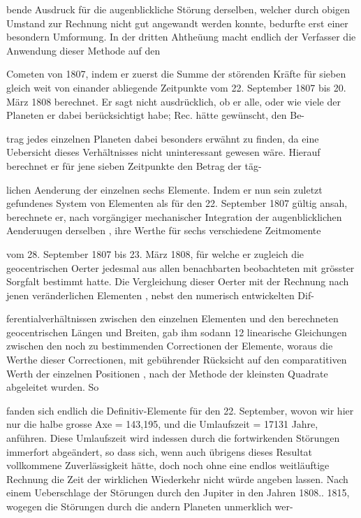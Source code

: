 \documentclass[10pt,a4paper]{article}
\begin{document}
bende Ausdruck für die augenblickliche Störung derselben, welcher durch obigen Umstand zur Rechnung nicht gut angewandt werden konnte, bedurfte erst einer besondern Umformung. In der dritten Ahtheüung macht endlich der Verfasser die Anwendung dieser Methode auf den

Cometen von 1807, indem er zuerst die Summe der störenden Kräfte für sieben gleich weit von einander abliegende Zeitpunkte vom 22. September 1807 bis 20. März 1808 berechnet. Er sagt nicht ausdrücklich, ob er alle, oder wie viele der Planeten er dabei berücksichtigt habe; Rec. hätte gewünscht, den Be-

trag jedes einzelnen Planeten dabei besonders erwähnt zu finden, da eine Uebersicht dieses Verhältnisses nicht uninteressant gewesen wäre. Hierauf berechnet er für jene sieben Zeitpunkte den Betrag der täg-

lichen Aenderung der einzelnen sechs Elemente. Indem er nun sein zuletzt gefundenes System von Elementen als für den 22. September 1807 gültig ansah, berechnete er, nach vorgängiger mechanischer Integration der augenblicklichen Aenderuugen derselben , ihre Werthe für sechs verschiedene Zeitmomente

vom 28. September 1807 bis 23. März 1808, für welche er zugleich die geocentrischen Oerter jedesmal aus allen benachbarten beobachteten mit grösster Sorgfalt bestimmt hatte. Die Vergleichung dieser Oerter mit der Rechnung nach jenen veränderlichen Elementen , nebst den numerisch entwickelten Dif-

ferentialverhältnissen zwischen den einzelnen Elementen und den berechneten geocentrischen Längen und Breiten, gab ihm sodann 12 linearische Gleichungen zwischen den noch zu bestimmenden Correctionen der Elemente, woraus die Werthe dieser Correctionen, mit gebührender Rücksicht auf den comparatitiven Werth der einzelnen Positionen , nach der Methode der kleinsten Quadrate abgeleitet wurden. So

fanden sich endlich die Definitiv-Elemente für den 22. September, wovon wir hier nur die halbe grosse Axe = 143,195, und die Umlaufszeit = 17131 Jahre, anführen. Diese Umlaufszeit wird indessen durch die fortwirkenden Störungen immerfort abgeändert, so dass sich, wenn auch übrigens dieses Resultat vollkommene Zuverlässigkeit hätte, doch noch ohne eine endlos weitläuftige Rechnung die Zeit der wirklichen Wiederkehr nicht würde angeben lassen. Nach einem Ueberschlage der Störungen durch den Jupiter in den Jahren 1808.. 1815, wogegen die Störungen durch die andern Planeten unmerklich wer-
\end{document}
